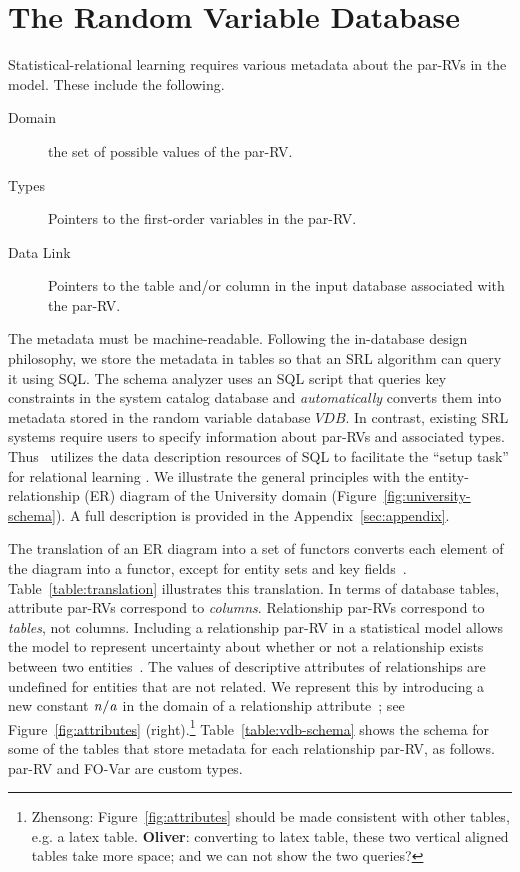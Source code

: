 \section{The Random Variable Database} 

Statistical-relational learning requires various metadata about the par-RVs in the model. These include the following. 

\begin{description}
\item[Domain] the set of possible values of the par-RV.
\item[Types] Pointers to the first-order variables
in the par-RV. 
\item[Data Link] Pointers to the table and/or column in the input database associated with the par-RV. 
\end{description}
%
The metadata must be machine-readable. Following the in-database design philosophy, we store the metadata in tables so that an SRL algorithm can query it using SQL. The schema analyzer uses an SQL script that queries key constraints in the system catalog database and {\em automatically} converts them into metadata stored in the random variable database $VDB$. In contrast, existing SRL systems require users to specify information about par-RVs and associated types. 
Thus \FB\  utilizes the data description resources of SQL to facilitate the ``setup task'' for relational learning \cite{Walker2010}. We illustrate the general principles with the entity-relationship (ER) diagram of the University domain (Figure~\ref{fig:university-schema}). A full description is provided in the Appendix~\ref{sec:appendix}.



The translation of an ER diagram into a set of functors converts each element of the diagram into a functor, except for entity sets and key fields~\cite{Heckerman+al:SRL07}. Table~\ref{table:translation} illustrates this translation. In terms of database tables, attribute par-RVs correspond to {\em columns}. Relationship par-RVs correspond to {\em tables}, not columns. Including a relationship par-RV in a statistical model allows the model to represent uncertainty about whether or not a relationship exists between two entities~\cite{Kimmig2015}. The values of descriptive attributes of relationships are undefined for entities that are not related. We represent this by introducing a new constant $\it{n/a}$ in the domain of a relationship attribute~\cite{Milch2005}; see Figure~\ref{fig:attributes} (right).\footnote{Zhensong: Figure~\ref{fig:attributes} should be made consistent with other tables, e.g. a latex table. \textbf{Oliver}: converting to latex table, these two vertical aligned tables take more space; and we can not show the two queries?} Table~\ref{table:vdb-schema} shows the schema for some of the tables that store metadata for 
each relationship par-RV, as follows. par-RV and FO-Var are custom types.

